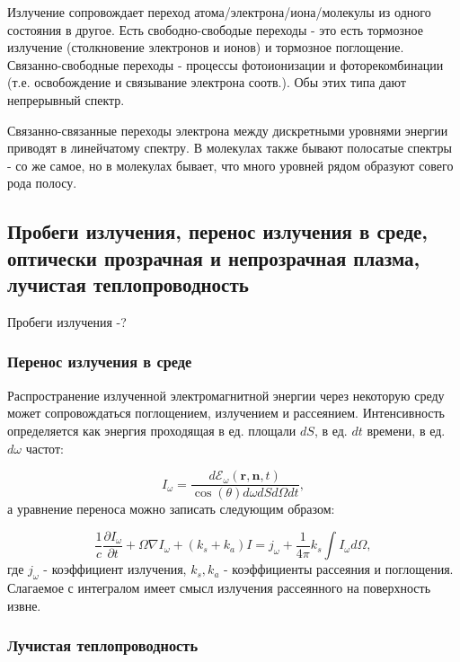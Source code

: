 \documentclass[10pt, a4paper]{article}
\begin{document}
Излучение сопровождает переход атома/электрона/иона/молекулы из одного состояния в другое. Есть свободно-свободые переходы
- это есть тормозное излучение (столкновение электронов и ионов) и тормозное поглощение. Связанно-свободные переходы - 
процессы фотоионизации и фоторекомбинации (т.е. освобождение и связывание электрона соотв.). Обы этих типа дают 
непрерывный спектр.

Связанно-связанные переходы электрона между дискретными уровнями энергии приводят в линейчатому спектру. В молекулах также
бывают полосатые спектры - со же самое, но в молекулах бывает, что много уровней рядом образуют совего рода полосу.

\subsection{Пробеги излучения, перенос излучения в среде, оптически прозрачная и непрозрачная плазма, лучистая теплопроводность}
Пробеги излучения -?

\subsubsection{Перенос излучения в среде}
Распространение излученной электромагнитной энергии через некоторую среду может сопровождаться поглощением, излучением и рассеянием. Интенсивность определяется как энергия проходящая в ед. площали $dS$, в ед. $dt$ времени, в ед. $d\omega$ частот:

\begin{equation}
    \label{alfven}
    I_{\omega} = \frac{d\mathcal{E}_{\omega}(\mathbf{r},\mathbf{n},t)}{\cos(\theta)d\omega dSd\Omega dt},
\end{equation}
а уравнение переноса можно записать следующим образом:

\begin{equation}
    \label{alfven}
    \frac{1}{c} \frac{\partial I_{\omega}}{\partial t} + \mathcal{\Omega}\nabla I_{\omega} + (k_s + k_a) I = j_{\omega} + \frac{1}{4\pi} k_s \int I_{\omega} d\Omega,
\end{equation}
где $j_{\omega}$ - коэффициент излучения, $k_s, k_a$ - коэффициенты рассеяния и поглощения. Слагаемое с интегралом имеет смысл излучения рассеянного на поверхность извне.

\subsubsection{Лучистая теплопроводность}
\end{document}
